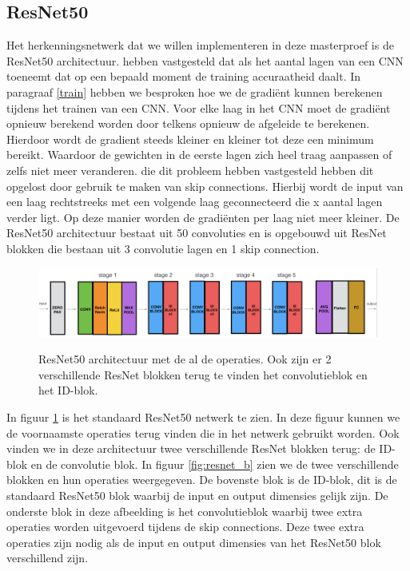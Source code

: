 \subsection{ResNet50} \label{resnet}
Het herkenningsnetwerk dat we willen implementeren in deze masterproef is de ResNet50 architectuur.
\cite{he2015deep} hebben vastgesteld dat als het aantal lagen van een CNN toeneemt dat op een bepaald moment de training accuraatheid daalt.
In paragraaf \ref{train} hebben we besproken hoe we de gradi\"ent kunnen berekenen tijdens het trainen van een CNN.
Voor elke laag in het CNN moet de gradi\"ent opnieuw berekend worden door telkens opnieuw de afgeleide te berekenen.
Hierdoor wordt de gradient steeds kleiner en kleiner tot deze een minimum bereikt.
Waardoor de gewichten in de eerste lagen zich heel traag aanpassen of zelfs niet meer veranderen.
\cite{he2015deep} die dit probleem hebben vastgesteld hebben dit opgelost door gebruik te maken van skip connections.
Hierbij wordt de input van een laag rechtstreeks met een volgende laag geconnecteerd die x aantal lagen verder ligt.
Op deze manier worden de gradi\"enten per laag niet meer kleiner.
De ResNet50 architectuur bestaat uit 50 convoluties en is opgebouwd uit ResNet blokken die bestaan uit 3 convolutie lagen en 1 skip connection.

\begin{figure}[!ht]
	\centering
	\includegraphics[width=1.0\linewidth]{fig/resnet50.png}
	\caption{ResNet50 architectuur met de al de operaties. Ook zijn er 2 verschillende ResNet blokken terug te vinden het convolutieblok en het ID-blok.}
	\label{fig:resnet}
	\cite{Raghunandepu_resnet_2019}
\end{figure}

In figuur \ref{fig:resnet} is het standaard ResNet50 netwerk te zien.
In deze figuur kunnen we de voornaamste operaties terug vinden die in het netwerk gebruikt worden.
Ook vinden we in deze architectuur twee verschillende ResNet blokken terug: de ID-blok en de convolutie blok.
In figuur \ref{fig:resnet_b} zien we de twee verschillende blokken en hun operaties weergegeven.
De bovenste blok is de ID-blok, dit is de standaard ResNet50 blok waarbij de input en output dimensies gelijk zijn.
De onderste blok in deze afbeelding is het convolutieblok waarbij twee extra operaties worden uitgevoerd tijdens de skip connections.
Deze twee extra operaties zijn nodig als de input en output dimensies van het ResNet50 blok verschillend zijn.

